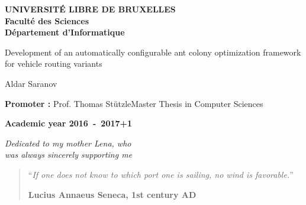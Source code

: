 \documentclass[12pt,a4paper,oneside]{book}
\begin{document}
\onehalfspacing

\frontmatter
\begin{titlepage}
\begin{center}
\textbf{UNIVERSIT\'E LIBRE DE BRUXELLES}\\
\textbf{Facult\'e des Sciences}\\
\textbf{D\'epartement d'Informatique}
\vfill{}\vfill{}

{\Huge Development of an automatically configurable ant colony optimization framework for vehicle routing variants}

{\Huge \par}
\begin{center}{\LARGE Aldar Saranov}\end{center}{\Huge \par}
\vfill{}\vfill{}
\begin{flushright}{\large \textbf{Promoter :} Prof. Thomas St{\"u}tzle}\hfill{}{\large Master Thesis in Computer Sciences}\\
{\large }\hfill{}{}\end{flushright}{\large\par}
\vfill{}\vfill{}\enlargethispage{3cm}
\textbf{Academic year 2016~-~2017+1}
\end{center}
\end{titlepage}
\newpage
\thispagestyle{empty} 
\null

\newenvironment{vcenterpage}
{\newpage\thispagestyle{empty} 
\vspace*{\fill}}
{\vspace*{\fill}\par\pagebreak}

\begin{vcenterpage}
\begin{flushright}
    \large\em\null\vskip1in 
    Dedicated to my mother Lena, who\\
   was always sincerely supporting me\vfill
  \end{flushright}
\end{vcenterpage}
\thispagestyle{empty}
\vspace*{5cm}

\begin{quotation}
\noindent ``\emph{If one does not know to which port one is sailing, no wind is favorable.}''
\begin{flushright}\textbf{Lucius Annaeus Seneca, 1st century AD}\end{flushright}
\end{quotation}
\end{document}
